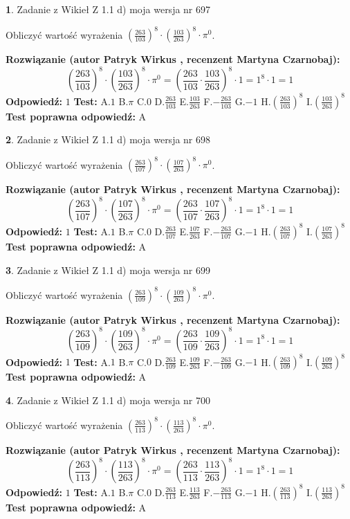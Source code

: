 \documentclass[12pt, a4paper]{article}
\theoremstyle{definition} %
\newtheorem{zad}{}
\newcommand{\zadStart}[1]{\begin{zad}#1\newline}
\newcommand{\zadStop}{\end{zad}}
\newcommand{\rozwStart}[2]{\noindent \textbf{Rozwiązanie (autor #1 , recenzent #2): }\newline}
\newcommand{\rozwStop}{\newline}
\newcommand{\odpStart}{\noindent \textbf{Odpowiedź:}\newline}
\newcommand{\odpStop}{\newline}
\newcommand{\testStart}{\noindent \textbf{Test:}\newline}
\newcommand{\testStop}{\newline}
\newcommand{\kluczStart}{\noindent \textbf{Test poprawna odpowiedź:}\newline}
\newcommand{\kluczStop}{\newline}
\begin{document}
\zadStart{Zadanie z Wikieł Z 1.1 d) moja wersja nr 697}

Obliczyć wartość wyrażenia $(\frac{263}{103})^{8} \cdot (\frac{103}{263})^{8} \cdot \pi^{0}$.
\zadStop
\rozwStart{Patryk Wirkus}{Martyna Czarnobaj}
$$(\frac{263}{103})^{8} \cdot (\frac{103}{263})^{8} \cdot \pi^{0} = (\frac{263}{103} \cdot \frac{103}{263})^{8} \cdot 1 = 1^{8} \cdot 1 = 1$$
\rozwStop
\odpStart
$1$
\odpStop
\testStart
A.$1$ B.$\pi$ C.$0$ D.$\frac{263}{103}$ E.$\frac{103}{263}$
F.$-\frac{263}{103}$ G.$-1$
H.$(\frac{263}{103})^{8}$
I.$(\frac{103}{263})^{8}$
\testStop
\kluczStart
A
\kluczStop



\zadStart{Zadanie z Wikieł Z 1.1 d) moja wersja nr 698}

Obliczyć wartość wyrażenia $(\frac{263}{107})^{8} \cdot (\frac{107}{263})^{8} \cdot \pi^{0}$.
\zadStop
\rozwStart{Patryk Wirkus}{Martyna Czarnobaj}
$$(\frac{263}{107})^{8} \cdot (\frac{107}{263})^{8} \cdot \pi^{0} = (\frac{263}{107} \cdot \frac{107}{263})^{8} \cdot 1 = 1^{8} \cdot 1 = 1$$
\rozwStop
\odpStart
$1$
\odpStop
\testStart
A.$1$ B.$\pi$ C.$0$ D.$\frac{263}{107}$ E.$\frac{107}{263}$
F.$-\frac{263}{107}$ G.$-1$
H.$(\frac{263}{107})^{8}$
I.$(\frac{107}{263})^{8}$
\testStop
\kluczStart
A
\kluczStop



\zadStart{Zadanie z Wikieł Z 1.1 d) moja wersja nr 699}

Obliczyć wartość wyrażenia $(\frac{263}{109})^{8} \cdot (\frac{109}{263})^{8} \cdot \pi^{0}$.
\zadStop
\rozwStart{Patryk Wirkus}{Martyna Czarnobaj}
$$(\frac{263}{109})^{8} \cdot (\frac{109}{263})^{8} \cdot \pi^{0} = (\frac{263}{109} \cdot \frac{109}{263})^{8} \cdot 1 = 1^{8} \cdot 1 = 1$$
\rozwStop
\odpStart
$1$
\odpStop
\testStart
A.$1$ B.$\pi$ C.$0$ D.$\frac{263}{109}$ E.$\frac{109}{263}$
F.$-\frac{263}{109}$ G.$-1$
H.$(\frac{263}{109})^{8}$
I.$(\frac{109}{263})^{8}$
\testStop
\kluczStart
A
\kluczStop



\zadStart{Zadanie z Wikieł Z 1.1 d) moja wersja nr 700}

Obliczyć wartość wyrażenia $(\frac{263}{113})^{8} \cdot (\frac{113}{263})^{8} \cdot \pi^{0}$.
\zadStop
\rozwStart{Patryk Wirkus}{Martyna Czarnobaj}
$$(\frac{263}{113})^{8} \cdot (\frac{113}{263})^{8} \cdot \pi^{0} = (\frac{263}{113} \cdot \frac{113}{263})^{8} \cdot 1 = 1^{8} \cdot 1 = 1$$
\rozwStop
\odpStart
$1$
\odpStop
\testStart
A.$1$ B.$\pi$ C.$0$ D.$\frac{263}{113}$ E.$\frac{113}{263}$
F.$-\frac{263}{113}$ G.$-1$
H.$(\frac{263}{113})^{8}$
I.$(\frac{113}{263})^{8}$
\testStop
\kluczStart
A
\kluczStop
\end{document}
